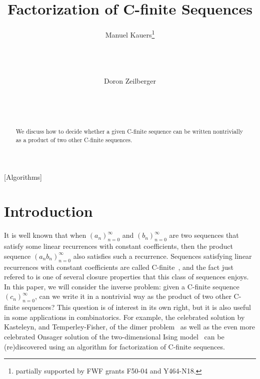 \documentclass{sig-alternate}
\begin{document}
\title{Factorization of C-finite Sequences}


\author{\alignauthor
 \leavevmode\mathstrut Manuel Kauers\thanks{partially supported by FWF grants F50-04 and Y464-N18.}\\[\medskipamount]
  \\
  \\
  \\
 \and
 \mathstrut Doron Zeilberger\\[\medskipamount]
  \\
  \\
  \\
}

\maketitle
\begin{abstract}
  We discuss how to decide whether a given C-finite sequence
  can be written nontrivially as a product of two other
  C-finite sequences. 
\end{abstract}


[Algorithms]






\section{Introduction}

It is well known that when $(a_n)_{n=0}^\infty$ and $(b_n)_{n=0}^\infty$ are two
sequences that satisfy some linear recurrences with constant coefficients, then
the product sequence $(a_nb_n)_{n=0}^\infty$ also satisfies such a recurrence.
Sequences satisfying linear recurrences with constant coefficients are called
C-finite~\cite{zeilberger90,kauers10j,zeilberger13}, and the fact just refered to is one of several closure
properties that this class of sequences enjoys.  In this paper, we will consider
the inverse problem: given a C-finite sequence $(c_n)_{n=0}^\infty$, can we
write it in a nontrivial way as the product of two other C-finite sequences?
This question is of interest in its own right, but it is also useful in some
applications in combinatorics.  For example, the celebrated solution by
Kasteleyn, and Temperley-Fisher, of the dimer problem~\cite{fisher61,kasteleyn61} as well as the even
more celebrated Onsager solution of the two-dimensional Ising model~\cite{onsager44}
can be (re)discovered using an algorithm for factorization of C-finite
sequences.
\end{document}

